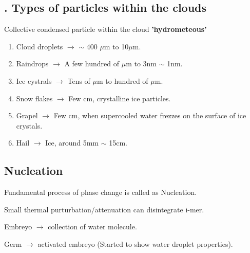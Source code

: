 \documentclass[fleqn,10pt]{SelfArx} %
\begin{document}

\subsection{. Types of particles within the clouds}
Collective condensed particle within the cloud \textbf{'hydrometeous'}
\begin{enumerate}[noitemsep]
    \item Cloud droplets $\rightarrow$ $\sim$ 400 $\mu$m to 10$\mu$m.
    \item Raindrops $\rightarrow$ A few hundred of $\mu$m to 3nm $\sim$ 1nm.
    \item Ice cystrals $\rightarrow$ Tens of $\mu$m to hundred of $\mu$m.
    \item Snow flakes $\rightarrow$ Few cm, crystalline ice particles.
    \item Grapel $\rightarrow$ Few cm, when supercooled water frezzes on the surface of ice crystals.
    \item Hail $\rightarrow$ Ice, around 5mm $\sim$ 15cm.
\end{enumerate}

\subsection{Nucleation}
Fundamental process of phase change is called as Nucleation.

Small thermal purturbation/attenuation can disintegrate i-mer.

Embreyo $\rightarrow$ collection of water molecule.

Germ $\rightarrow$ activated embreyo (Started to show water droplet properties). \\
\end{document}
